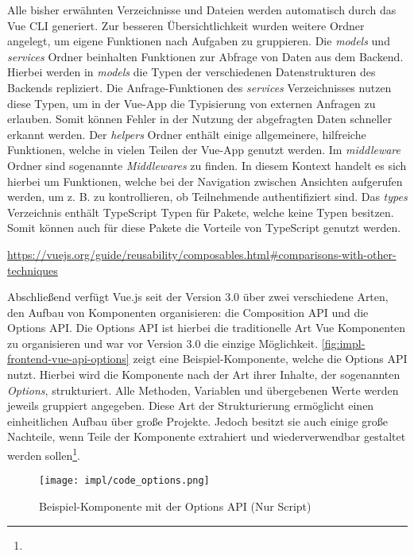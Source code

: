 Alle bisher erwähnten Verzeichnisse und Dateien werden automatisch durch das Vue
CLI generiert. Zur besseren Übersichtlichkeit wurden weitere Ordner angelegt, um
eigene Funktionen nach Aufgaben zu gruppieren. Die \textit{models} und
\textit{services} Ordner beinhalten Funktionen zur Abfrage von Daten aus dem
Backend. Hierbei werden in \textit{models} die Typen der verschiedenen
Datenstrukturen des Backends repliziert. Die Anfrage-Funktionen des
\textit{services} Verzeichnisses nutzen diese Typen, um in der Vue-App die
Typisierung von externen Anfragen zu erlauben. Somit können Fehler in der
Nutzung der abgefragten Daten schneller erkannt werden. Der \textit{helpers}
Ordner enthält einige allgemeinere, hilfreiche Funktionen, welche in vielen
Teilen der Vue-App genutzt werden. Im \textit{middleware} Ordner sind sogenannte
\textit{Middlewares} zu finden. In diesem Kontext handelt es sich hierbei um
Funktionen, welche bei der Navigation zwischen Ansichten aufgerufen werden, um
z. B. zu kontrollieren, ob Teilnehmende authentifiziert sind. Das \textit{types}
Verzeichnis enthält TypeScript Typen für Pakete, welche keine Typen besitzen.
Somit können auch für diese Pakete die Vorteile von TypeScript genutzt werden.


\urldef\vuemixin\url{https://vuejs.org/guide/reusability/composables.html#comparisons-with-other-techniques}

Abschließend verfügt Vue.js seit der Version 3.0 über zwei verschiedene Arten,
den Aufbau von Komponenten organisieren: die Composition API und die Options
API. Die Options API ist hierbei die traditionelle Art Vue Komponenten zu
organisieren und war vor Version 3.0 die einzige Möglichkeit.
\autoref{fig:impl-frontend-vue-api-options} zeigt eine Beispiel-Komponente,
welche die Options API nutzt. Hierbei wird die Komponente nach der Art ihrer
Inhalte, der sogenannten \textit{Options}, strukturiert. Alle Methoden, Variablen und
übergebenen Werte werden jeweils gruppiert angegeben. Diese Art der
Strukturierung ermöglicht einen einheitlichen Aufbau über große Projekte. Jedoch
besitzt sie auch einige große Nachteile, wenn Teile der Komponente extrahiert
und wiederverwendbar gestaltet werden sollen\footnote{\vuemixin}.

\begin{figure}[htpb]
    \centering
    \texttt{[image: impl/code\_options.png]}
    \caption{Beispiel-Komponente mit der Options API (Nur Script)}
    \label{fig:impl-frontend-vue-api-options}
\end{figure}

